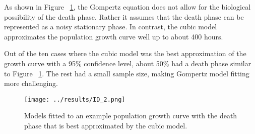 \documentclass[11pt]{article}
\begin{document}
  As shown in Figure ~\ref{ID2}, the Gompertz equation does not allow for the biological possibility of the death phase. Rather it assumes that the death phase can be represented as  a noisy stationary phase. In contrast, the cubic model approximates the population growth curve well up to about 400 hours. 

  Out of the ten cases where the cubic model was the best approximation of the growth curve with a 95\% confidence level, about 50\% had a death phase similar to Figure ~\ref{ID2}.  The rest had a small sample size, making Gompertz model fitting more challenging. 

  \begin{figure}[!ht]
    \centering
    \texttt{[image: ../results/ID\_2.png]}
    \caption{Models fitted to an example population growth curve with the death phase that is best approximated by the cubic model.}
    \label{ID2}
   \end{figure}

  
  
  
\end{document}
